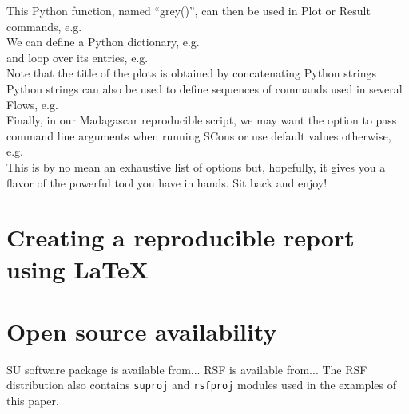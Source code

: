 

This Python function, named ``grey()'', can then be used in Plot or Result
commands, e.g.\\



We can define a Python dictionary, e.g.\\



\noindent and loop over its entries, e.g.\\



Note that the title of the plots is obtained by concatenating Python
strings\\



Python strings can also be used to define sequences of commands used
in several Flows, e.g.\\



Finally, in our Madagascar reproducible script, we may want the option
to pass command line arguments when running SCons or use default
values otherwise, e.g.\\



This is by no mean an exhaustive list of options but, hopefully, it
gives you a flavor of the powerful tool you have in hands. Sit back
and enjoy!

\section{Creating a reproducible report using \LaTeX}



\section{Open source availability}

SU software package is available from... RSF is available from... The
RSF distribution also contains \texttt{suproj} and \texttt{rsfproj}
modules used in the examples of this paper.




